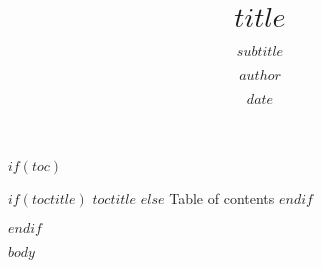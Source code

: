 \documentclass[compress,11pt]{beamer}
\title{$title$}
\subtitle{$subtitle$}
\author{$author$}
\institute{$institute$}
\date{$date$}
\begin{document}


$if(toc)$
\begin{frame}{
	$if(toctitle)$%
	$toctitle$%
	$else$%
	Table of contents%
	$endif$%
	}
	\tableofcontents
\end{frame}
$endif$

$body$
\end{document}
